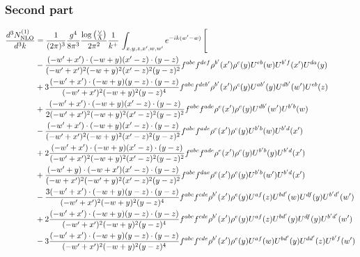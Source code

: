 \documentclass[aps,prd,amsmath,amssymb,nofootinbib]{revtex4-2}
\numberwithin{equation}{section}
\begin{document}
\subsubsection{Second part}
\begin{align}
     \frac{d^{3}N^{(1)}_{\rm NLO}}{d^{3}k} & = \frac{1}{(2\pi)^{3}}\frac{g^{4}}{8\pi^{3}}\frac{\log{\left(\frac{\vee}{\Lambda}\right)}}{2\pi^{2}} \frac{1}{k^{+}}\,\int_{x,y,z,x^{\prime},w,w^{\prime}}e^{-ik(w^{\prime}-w)}\, \Bigg[\notag \\ & - \frac{( - w' + x') \cdot ( - w + y) (x' - z) \cdot (y - z)}{( - w' + x')^{2} ( - w + y)^{2} (x' - z)^{2} (y - z)^{2}} f^{a b c} f^{d e f} \rho^{b'}(x') \rho^{c}(y) U^{e b}(w) U^{b' f}(x') U^{d a}(y) \nonumber\\
      &+ 3 \frac{( - w' + x') \cdot ( - w + y) (y - z) \cdot (y - z)}{( - w' + x')^{2} ( - w + y)^{2} (y - z)^{4}} f^{a b c} f^{d e b'} \rho^{b'}(x') \rho^{c}(y) U^{a b'}(y) U^{d b'}(w') U^{e b}(z)\nonumber\\
    &+\frac{( - w' + x') \cdot ( - w + y) (x' - z) \cdot (y - z)}{2 ( - w' + x')^{2} ( - w + y)^{2} (x' - z)^{2} (y - z)^{2}} f^{a b c} f^{a d e} \rho^{e}(x') \rho^{c}(y) U^{d b'}(w') U^{b' b}(w)\nonumber\\
    &- \frac{( - w' + x') \cdot ( - w + y) (x' - z) \cdot (y - z)}{( - w' + x')^{2} ( - w + y)^{2} (x' - z)^{2} (y - z)^{2}} f^{a b c} f^{a d e} \rho^{e}(x') \rho^{c}(y) U^{b' b}(w) U^{b' d}(x')\nonumber\\
    &+ 2 \frac{( - w' + x') \cdot ( - w + y) (x' - z) \cdot (y - z)}{( - w' + x')^{2} ( - w + y)^{2} (x' - z)^{2} (y - z)^{2}} f^{a b c} f^{a d e} \rho^{e}(x') \rho^{c}(y) U^{b' b}(y) U^{b' d}(x')\nonumber\\
    &+ \frac{( - w' + y) \cdot ( - w + x') (x' - z) \cdot (y - z)}{( - w + x')^{2} ( - w' + y)^{2} (x' - z)^{2} (y - z)^{2}} f^{a b c} f^{d a e} \rho^{e}(x') \rho^{c}(y) U^{b' b}(w') U^{b' d}(x')\nonumber\\
    &-\frac{3 ( - w' + x') \cdot ( - w + y) (y - z) \cdot (y - z)}{( - w' + x')^{2} ( - w + y)^{2} (y - z)^{4}} f^{a b c} f^{c d e} \rho^{b'}(x') \rho^{e}(y) U^{a f}(z) U^{b d'}(w) U^{d f}(y) U^{b' d'}(w')\nonumber\\
    &+ 2 \frac{( - w' + x') \cdot ( - w + y) (y - z) \cdot (y - z)}{( - w' + x')^{2} ( - w + y)^{2} (y - z)^{4}} f^{a b c} f^{c d e} \rho^{b'}(x') \rho^{e}(y) U^{a f}(z) U^{b d'}(y) U^{d f}(y) U^{b' d'}(w')\nonumber\\
    &- 3 \frac{( - w' + x') \cdot ( - w + y) (y - z) \cdot (y - z)}{( - w' + x')^{2} ( - w + y)^{2} (y - z)^{4}} f^{a b c} f^{c d e} \rho^{b'}(x') \rho^{e}(y) U^{a f}(w) U^{b d'}(y) U^{d d'}(z) U^{b' f}(w')\nonumber\\

\end{align}
\end{document}
